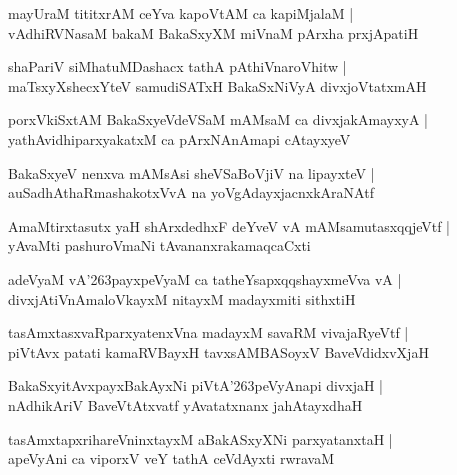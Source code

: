 \documentclass[twoside,12pt,openright]{book}
\def\S{\char'263}
\newcounter{shloka}[chapter]
\begin{document}
\begin{shloka}
mayUraM tititxrAM  ceYva kapoVtAM ca kapiMjalaM |\\
vAdhiRVNasaM bakaM BakaSxyXM miVnaM pArxha prxjApatiH 
\end{shloka}

\begin{shloka}
shaPariV siMhatuMDashacx tathA pAthiVnaroVhitw |\\
maTsxyXshecxYteV samudiSATxH BakaSxNiVyA divxjoVtatxmAH
\end{shloka}

\begin{shloka}
porxVkiSxtAM BakaSxyeVdeVSaM mAMsaM ca divxjakAmayxyA |\\
yathAvidhiparxyakatxM ca pArxNAnAmapi cAtayxyeV 
\end{shloka}

\begin{shloka}
BakaSxyeV nenxva mAMsAsi sheVSaBoVjiV na lipayxteV |\\
auSadhAthaRmashakotxVvA na yoVgAdayxjacnxkAraNAtf 
\end{shloka}

\begin{shloka}
AmaMtirxtasutx yaH shArxdedhxF deYveV vA mAMsamutasxqqjeVtf |\\
yAvaMti pashuroVmaNi tAvananxrakamaqcaCxti
\end{shloka}

\begin{shloka}
adeVyaM vA\S payxpeVyaM ca tatheYsapxqqshayxmeVva vA |\\
divxjAtiVnAmaloVkayxM nitayxM madayxmiti sithxtiH 
\end{shloka}

\begin{shloka}
tasAmxtasxvaRparxyatenxVna madayxM savaRM vivajaRyeVtf |\\
piVtAvx patati kamaRVBayxH tavxsAMBASoyxV BaveVdidxvXjaH 
\end{shloka}

\begin{shloka}
BakaSxyitAvxpayxBakAyxNi piVtA\S peVyAnapi divxjaH |\\
nAdhikAriV BaveVtAtxvatf yAvatatxnanx ja{}hAtayxdhaH
\end{shloka}

\begin{shloka}
tasAmxtapxrihareVninxtayxM aBakASxyXNi parxyatanxtaH |\\
apeVyAni ca viporxV veY tathA ceVdAyxti rwravaM 
\end{shloka}
\end{document}
